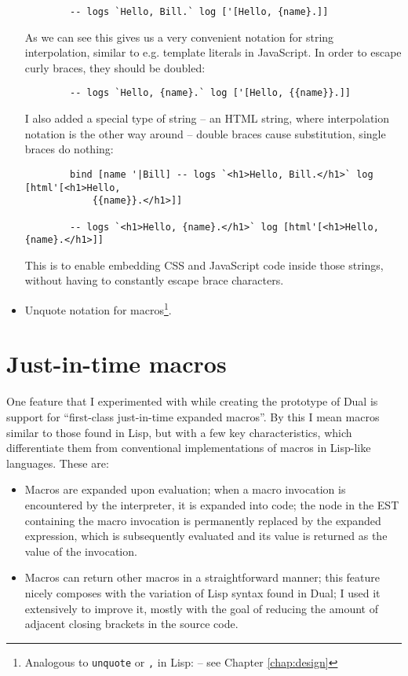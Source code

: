 \begin{itemize}
\begin{lstlisting}
        -- logs `Hello, Bill.` log ['[Hello, {name}.]]
    \end{lstlisting}
    
    As we can see this gives us a very convenient notation for string
    interpolation, similar to e.g. template literals in
    JavaScript\cite{mdn_template_strings}.
    In order to escape curly braces, they should be doubled:
    \begin{lstlisting}
        -- logs `Hello, {name}.` log ['[Hello, {{name}}.]]
    \end{lstlisting}
    
    I also added a special type of string -- an HTML string, where interpolation
    notation is the other way around -- double braces cause substitution, single
    braces do nothing:
    \begin{lstlisting}
        bind [name '|Bill] -- logs `<h1>Hello, Bill.</h1>` log [html'[<h1>Hello,
            {{name}}.</h1>]]
        
        -- logs `<h1>Hello, {name}.</h1>` log [html'[<h1>Hello, {name}.</h1>]]
    \end{lstlisting}
    
    This is to enable embedding CSS and JavaScript code inside those strings,
    without having to constantly escape brace characters.
    
    \item Unquote notation for macros\footnote{Analogous to \texttt{unquote} or
      \texttt{,} in Lisp:
      \cite[Section~1.3.8]{racket_reference}
      -- see Chapter \ref{chap:design}}.
\end{itemize}

\section{Just-in-time macros}\label{sec:mac}
One feature that I experimented with while creating the prototype of Dual is
support for ``first-class just-in-time expanded macros''. By this I mean macros
similar to those found in Lisp, but with a few key characteristics, which
differentiate them from conventional implementations of macros in Lisp-like
languages. These are:
\begin{itemize}
    \item Macros are expanded upon evaluation; when a macro invocation is
    encountered by the interpreter, it is expanded into code; the node in
    the EST containing the macro invocation is permanently replaced by the
    expanded expression, which is subsequently evaluated and its value is
    returned as the value of the invocation.
    \item Macros can return other macros in a straightforward manner; this
    feature nicely composes with the variation of Lisp syntax found in
    Dual; I used it extensively to improve it, mostly with the goal of
    reducing the amount of adjacent closing brackets in the source code.
\end{itemize}

